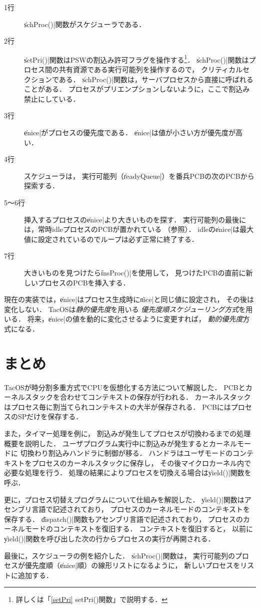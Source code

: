 

\begin{description}
\item[1行] \|schProc()|関数がスケジューラである．
\item[2行] \|setPri()|関数はPSWの割込み許可フラグを操作する\footnote{
  詳しくは「\ref{setPri} setPri()関数」で説明する．}．
  \|schProc()|関数はプロセス間の共有資源である実行可能列を操作するので，
  クリティカルセクションである．
  \|schProc()|関数は，サーバプロセスから直接に呼ばれることがある．
  プロセスがプリエンプションしないように，ここで割込み禁止にしている．
\item[3行] \|enice|がプロセスの優先度である．
  \|enice|は値が小さい方が優先度が高い．
\item[4行] スケジューラは，
  実行可能列（\|readyQueue|）を番兵PCBの次のPCBから探索する．
\item[5〜6行] 挿入するプロセスの\|enice|より大きいものを探す．
  実行可能列の最後には，常時idleプロセスのPCBが置かれている
  （参照）．
  idleの\|enice|は最大値に設定されているのでループは必ず正常に終了する．
\item[7行] 大きいものを見つけたら\|insProc()|を使用して，
  見つけたPCBの直前に新しいプロセスのPCBを挿入する．
\end{description}

現在の実装では，\|enice|はプロセス生成時に\|nice|と同じ値に設定され，
その後は変化しない．
TacOSは\emph{静的優先度}を用いる
\emph{優先度順スケジューリング方式}を用いる．
将来，\|enice|の値を動的に変化させるように変更すれば，
\emph{動的優先度}方式になる．

\section{まとめ}
TacOSが時分割多重方式でCPUを仮想化する方法について解説した．
PCBとカーネルスタックを合わせてコンテキストの保存が行われる．
カーネルスタックはプロセス毎に割当てられコンテキストの大半が保存される．
PCBにはプロセスのSPだけを保存する．

また，タイマー処理を例に，
割込みが発生してプロセスが切換わるまでの処理概要を説明した．
ユーザプログラム実行中に割込みが発生するとカーネルモードに
切換わり割込みハンドラに制御が移る．
ハンドラはユーザモードのコンテキストをプロセスのカーネルスタックに保存し，
その後マイクロカーネル内で必要な処理を行う．
処理の結果によりプロセスを切換える場合は\|yield()|関数を呼ぶ．

更に，プロセス切替えプログラムについて仕組みを解説した．
\|yield()|関数はアセンブリ言語で記述されており，
プロセスのカーネルモードのコンテキストを保存する．
\|dispatch()|関数もアセンブリ言語で記述されており，
プロセスのカーネルモードのコンテキストを復旧する．
コンテキストを復旧すると，
以前に\|yield()|関数を呼び出した次の行からプロセスの実行が再開される．

最後に，スケジューラの例を紹介した．
\|schProc()|関数は，
実行可能列のプロセスが優先度順（\|enice|順）の線形リストになるように，
新しいプロセスをリストに追加する．
